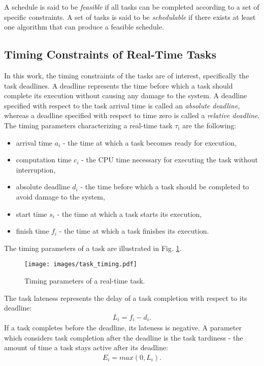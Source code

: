 A schedule is said to be \textit{feasible} if all tasks can be completed according to a set of specific constraints.
A set of tasks is said to be \textit{schedulable} if there exists at least one algorithm that can produce a feasible schedule.

\subsection{Timing Constraints of Real-Time Tasks}
In this work, the timing constraints of the tasks are of interest, specifically the task deadlines.
A deadline represents the time before which a task should complete its execution without causing any damage to the system.
A deadline specified with respect to the task arrival time is called an \textit{absolute deadline}, whereas a deadline specified with respect to time zero is called a \textit{relative deadline}.
The timing parameters characterizing a real-time task $\tau_i$ are the following:
\begin{itemize}
    \item arrival time $a_i$ - the time at which a task becomes ready for execution,
    \item computation time $c_i$ - the CPU time necessary for executing the task without interruption,
    \item absolute deadline $d_i$ - the time before which a task should be completed to avoid damage to the system,
    \item start time $s_i$ - the time at which a task starts its execution,
    \item finish time $f_i$ - the time at which a task finishes its execution.
\end{itemize}
The timing parameters of a task are illustrated in Fig. \ref{task_timing}.
\begin{figure}[ht]
    \centering
    \texttt{[image: images/task\_timing.pdf]}
    \caption{Timing parameters of a real-time task.}
    \label{task_timing}
\end{figure}
The task lateness represents the delay of a task completion with respect to its deadline:
\begin{align*}
L_i = f_i - d_i.
\end{align*}
If a task completes before the deadline, its lateness is negative.
A parameter which considers task completion after the deadline is the task tardiness - the amount of time a task stays active after its deadline:
\begin{align*}
E_i = max( 0, L_i ).
\end{align*}

